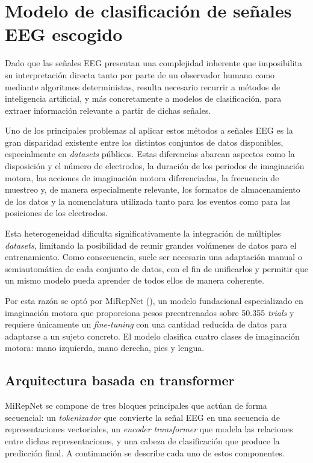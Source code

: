 \section{Modelo de clasificación de señales EEG escogido}
\label{sec:modelo}

Dado que las señales EEG presentan una complejidad inherente que imposibilita su interpretación directa tanto por parte de un observador humano como mediante algoritmos deterministas, resulta necesario recurrir a métodos de inteligencia artificial, y más concretamente a modelos de clasificación, para extraer información relevante a partir de dichas señales.

Uno de los principales problemas al aplicar estos métodos a señales EEG es la gran disparidad existente entre los distintos conjuntos de datos disponibles, especialmente en \textit{datasets} públicos. Estas diferencias abarcan aspectos como la disposición y el número de electrodos, la duración de los periodos de imaginación motora, las acciones de imaginación motora diferenciadas, la frecuencia de muestreo y, de manera especialmente relevante, los formatos de almacenamiento de los datos y la nomenclatura utilizada tanto para los eventos como para las posiciones de los electrodos.

Esta heterogeneidad dificulta significativamente la integración de múltiples \textit{datasets}, limitando la posibilidad de reunir grandes volúmenes de datos para el entrenamiento. Como consecuencia, suele ser necesaria una adaptación manual o semiautomática de cada conjunto de datos, con el fin de unificarlos y permitir que un mismo modelo pueda aprender de todos ellos de manera coherente.

Por esta razón se optó por MiRepNet (\cite{liu2025mirepnetpipelinefoundationmodel}), un modelo fundacional especializado en imaginación motora que proporciona pesos preentrenados sobre 50.355 \textit{trials} y requiere únicamente un \textit{fine-tuning} con una cantidad reducida de datos para adaptarse a un sujeto concreto. El modelo clasifica cuatro clases de imaginación motora: mano izquierda, mano derecha, pies y lengua.

\subsection{Arquitectura basada en transformer}
\label{subsec:arquitecturaModelo}

MiRepNet se compone de tres bloques principales que actúan de forma secuencial: un \textit{tokenizador} que convierte la señal EEG en una secuencia de representaciones vectoriales, un \textit{encoder} \textit{transformer} que modela las relaciones entre dichas representaciones, y una cabeza de clasificación que produce la predicción final. A continuación se describe cada uno de estos componentes.

